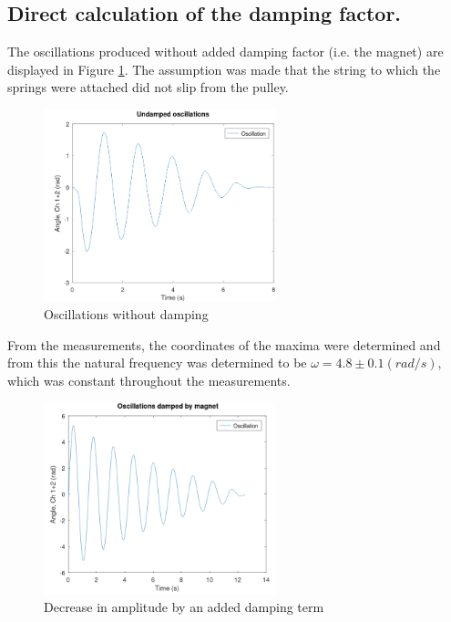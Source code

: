 \subsection{Direct calculation of the damping factor.}

The oscillations produced without added damping factor (i.e. the magnet) are displayed in Figure \ref{fig:undamped_oscillations}. The assumption was made that the string to which the springs were attached did not slip from the pulley.

\begin{figure}[h!]
  \centering
  \includegraphics[width=0.6\textwidth]{oscillations/images/Undamped_Oscillations}
  \caption{Oscillations without damping}
  \label{fig:undamped_oscillations}
\end{figure}

From the measurements, the coordinates of the maxima were determined and from this the natural frequency was determined to be $\omega = 4.8 \pm 0.1 (rad/s)$, which was constant throughout the measurements.

\begin{figure}[h!]
  \centering
  \includegraphics[width=0.6\textwidth]{oscillations/images/underdamped}
  \caption{Decrease in amplitude by an added damping term}
  \label{fig:underdamped}
\end{figure}

